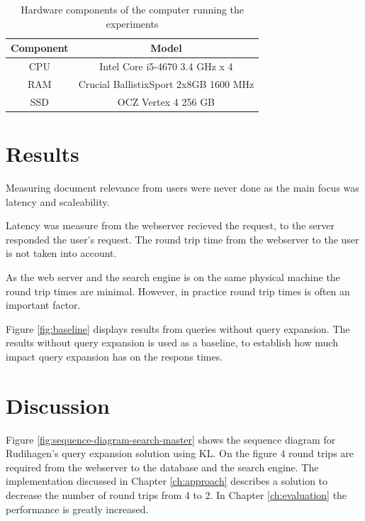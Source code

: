 \begin{table}[h]
    \centering
    \begin{tabular}{c|c}
      \textbf{Component} & \textbf{Model} \\ \hline
      CPU       & Intel Core i5-4670 3.4 GHz x 4        \\ \hline
      RAM       & Crucial BallistixSport 2x8GB 1600 MHz \\ \hline
      SSD       & OCZ Vertex 4 256 GB                   \\ \hline
    \end{tabular}
    \caption{Hardware components of the computer running the experiments}
    \label{tbl:hardware}
\end{table}

\section{Results}
Measuring document relevance from users were never done as the main focus was latency and scaleability.

Latency was measure from the webserver recieved the request, to the server responded the user's request.
The round trip time from the webserver to the user is not taken into account.

As the web server and the search engine is on the same physical machine the round trip times are minimal.
However, in practice round trip times is often an important factor.

Figure \ref{fig:baseline} displays results from queries without query expansion.
The results without query expansion is used as a baseline,
to establish how much impact query expansion has on the respons times.



\section{Discussion}
Figure \ref{fig:sequence-diagram-search-master} shows the sequence diagram for Rudihagen's query expansion solution using KL.
On the figure 4 round trips are required from the webserver to the database and the search engine.
The implementation discussed in Chapter \ref{ch:approach} describes a solution to decrease the number of round trips from 4 to 2.
In Chapter \ref{ch:evaluation} the performance is greatly increased.

